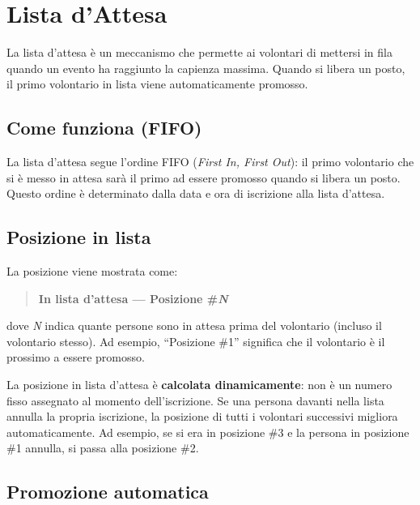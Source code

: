 \documentclass[a4paper,11pt,oneside]{book}
\begin{document}
\section{Lista d'Attesa}
\label{sec:lista-attesa}

La lista d'attesa \`e un meccanismo che permette ai volontari di mettersi in fila quando un evento ha raggiunto la capienza massima. Quando si libera un posto, il primo volontario in lista viene automaticamente promosso.

\subsection{Come funziona (FIFO)}

La lista d'attesa segue l'ordine FIFO (\textit{First In, First Out}): il primo volontario che si \`e messo in attesa sar\`a il primo ad essere promosso quando si libera un posto. Questo ordine \`e determinato dalla data e ora di iscrizione alla lista d'attesa.

\subsection{Posizione in lista}

La posizione viene mostrata come:

\begin{quote}
\textbf{In lista d'attesa --- Posizione \#\textit{N}}
\end{quote}

dove \textit{N} indica quante persone sono in attesa prima del volontario (incluso il volontario stesso). Ad esempio, ``Posizione \#1'' significa che il volontario \`e il prossimo a essere promosso.

\begin{infobox}
La posizione in lista d'attesa \`e \textbf{calcolata dinamicamente}: non \`e un numero fisso assegnato al momento dell'iscrizione. Se una persona davanti nella lista annulla la propria iscrizione, la posizione di tutti i volontari successivi migliora automaticamente. Ad esempio, se si era in posizione \#3 e la persona in posizione \#1 annulla, si passa alla posizione \#2.
\end{infobox}

\subsection{Promozione automatica}
\end{document}
